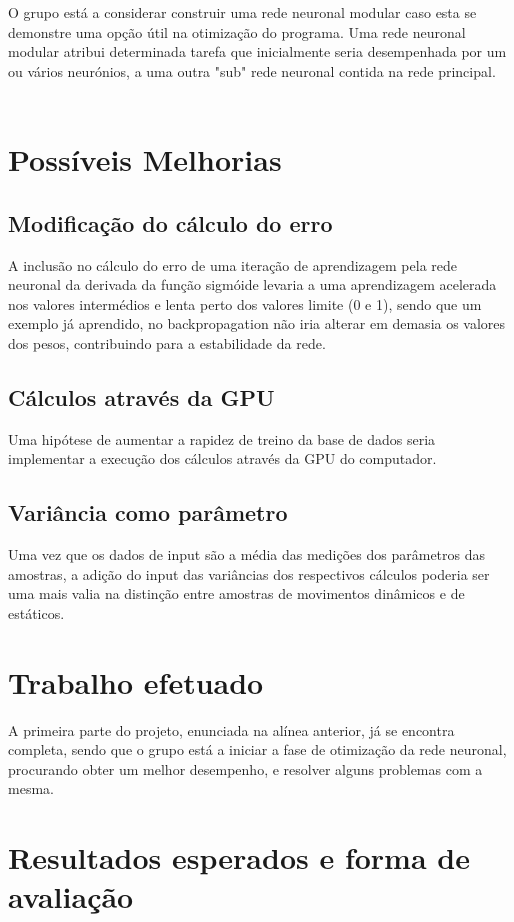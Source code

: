 \documentclass[10pt,a4paper]{article}
\begin{document}
O grupo está a considerar construir uma rede neuronal modular caso esta se demonstre uma opção útil na otimização do programa. Uma rede neuronal modular atribui determinada tarefa que inicialmente seria desempenhada por um ou vários neurónios, a uma outra "sub" rede neuronal contida na rede principal.
\\ \\

\section{Possíveis Melhorias}
\subsection{Modificação do cálculo do erro}
A inclusão no cálculo do erro de uma iteração de aprendizagem pela rede neuronal da derivada da função sigmóide levaria a uma aprendizagem acelerada nos valores intermédios e lenta perto dos valores limite (0 e 1), sendo que um exemplo já aprendido, no backpropagation não iria alterar em demasia os valores dos pesos, contribuindo para a estabilidade da rede. 

\subsection{Cálculos através da GPU}
Uma hipótese de aumentar a rapidez de treino da base de dados seria implementar a execução dos cálculos através da GPU do computador.

\subsection{Variância como parâmetro}
Uma vez que os dados de input são a média das medições dos parâmetros das amostras, a adição do input das variâncias dos respectivos cálculos poderia ser uma mais valia na distinção entre amostras de movimentos dinâmicos e de estáticos.

\section{Trabalho efetuado}
\subitem

A primeira parte do projeto, enunciada na alínea anterior, já se encontra completa, sendo que o grupo está a iniciar a fase de otimização da rede neuronal, procurando obter um melhor desempenho, e resolver alguns problemas com a mesma.


\section{Resultados esperados e forma de avaliação}
\subitem
\end{document}
